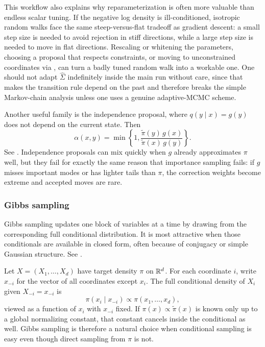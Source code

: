 This workflow also explains why reparameterization is often more valuable than endless scalar tuning.
If the negative log density is ill-conditioned, isotropic random walks face the same steep-versus-flat tradeoff as gradient descent: a small step size is needed to avoid rejection in stiff directions, while a large step size is needed to move in flat directions.
Rescaling or whitening the parameters, choosing a proposal that respects constraints, or moving to unconstrained coordinates via , can turn a badly tuned random walk into a workable one.
One should not adapt $\hat\Sigma$ indefinitely inside the main run without care, since that makes the transition rule depend on the past and therefore breaks the simple Markov-chain analysis unless one uses a genuine adaptive-MCMC scheme.

Another useful family is the independence proposal, where $q(y\mid x)=g(y)$ does not depend on the current state.
Then
\[
  \alpha(x,y)
  =
  \min\!\left\{1,\frac{\tilde\pi(y)\,g(x)}{\tilde\pi(x)\,g(y)}\right\}.
\]
See \citet[\S5.4.2]{liu_2002_monte_carlo}.
Independence proposals can mix quickly when $g$ already approximates $\pi$ well, but they fail for exactly the same reason that importance sampling fails: if $g$ misses important modes or has lighter tails than $\pi$, the correction weights become extreme and accepted moves are rare.

\subsubsection{Gibbs sampling}
\label{subsec:gibbs}

Gibbs sampling updates one block of variables at a time by drawing from the corresponding full conditional distribution.
It is most attractive when those conditionals are available in closed form, often because of conjugacy or simple Gaussian structure.
See \citet[\S6.1]{liu_2002_monte_carlo}.

Let $X=(X_1,\dots,X_d)$ have target density $\pi$ on $\mathbb{R}^d$.
For each coordinate $i$, write $x_{-i}$ for the vector of all coordinates except $x_i$.
The full conditional density of $X_i$ given $X_{-i}=x_{-i}$ is
\[
  \pi(x_i\mid x_{-i}) \propto \pi(x_1,\dots,x_d),
\]
viewed as a function of $x_i$ with $x_{-i}$ fixed.
If $\pi(x)\propto \tilde\pi(x)$ is known only up to a global normalizing constant, that constant cancels inside the conditional as well.
Gibbs sampling is therefore a natural choice when conditional sampling is easy even though direct sampling from $\pi$ is not.

